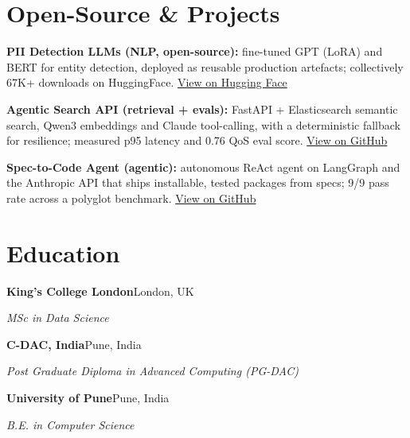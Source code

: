 \documentclass[10pt,a4paper]{article}
\begin{document}
\section{Open-Source \& Projects}
\begin{tight}
  \item \textbf{PII Detection LLMs (NLP, open-source):} fine-tuned GPT (LoRA) and BERT for entity detection, deployed as reusable production artefacts; collectively 67K+ downloads on HuggingFace. \href{https://huggingface.co/ab-ai/pii_model}{View on Hugging Face}
  \item \textbf{Agentic Search API (retrieval + evals):} FastAPI + Elasticsearch semantic search, Qwen3 embeddings and Claude tool-calling, with a deterministic fallback for resilience; measured p95 latency and 0.76 QoS eval score. \href{https://github.com/abhijeetscode/search-agent}{View on GitHub}
  \item \textbf{Spec-to-Code Agent (agentic):} autonomous ReAct agent on LangGraph and the Anthropic API that ships installable, tested packages from specs; 9/9 pass rate across a polyglot benchmark. \href{https://github.com/abhijeetscode/Spec-to-Code-Agent}{View on GitHub}
\end{tight}

\section{Education}
{\color{company}\bfseries King's College London}\hfill {\color{muted}London, UK}\par
{\itshape MSc in Data Science}\par\vspace{2pt}
{\color{company}\bfseries C-DAC, India}\hfill {\color{muted}Pune, India}\par
{\itshape Post Graduate Diploma in Advanced Computing (PG-DAC)}\par\vspace{2pt}
{\color{company}\bfseries University of Pune}\hfill {\color{muted}Pune, India}\par
{\itshape B.E. in Computer Science}\par
\end{document}
